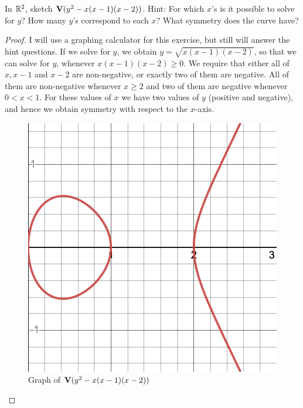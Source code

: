 \begin{exercise}{2}
In $\mathbb{R}^2$, sketch $\mathbf{V}(y^2-x(x-1)(x-2))$. 
Hint: For which $x$'s is it possible to solve for $y$? 
How many $y$'s correspond to each $x$? 
What symmetry does the curve have?
\end{exercise}
\begin{proof}
I will use a graphing calculator for this exercise, but still will answer the hint questions. 
If we solve for $y$, we obtain $y=\sqrt{x(x-1)(x-2)}$, so that we can solve for $y$, whenever $x(x-1)(x-2)\geq 0$. 
We require that either all of $x, x-1$ and $x-2$ are non-negative, or exactly two of them are negative. 
All of them are non-negative whenever $x\geq 2$ and two of them are negative whenever $0<x<1$. 
For these values of $x$ we have two values of $y$ (positive and negative), and hence we obtain symmetry with respect to the $x$-axis.
 \begin{figure}[H]
     \centering
     \includegraphics[width=.5\textwidth]{cox-little-oshea/ch1/assets/sec1-2-ex2.png}
     \caption{Graph of $\mathbf{V}(y^2-x(x-1)(x-2))$}
     \label{fig:sec1-2-ex2}
 \end{figure}
\end{proof}

